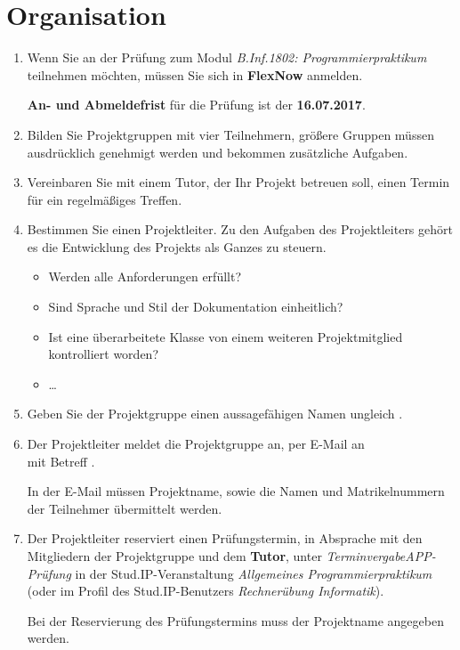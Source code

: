 \section*{Organisation}
\begin{enumerate}
\item Wenn Sie an der Prüfung zum Modul \emph{B.Inf.1802: Programmierpraktikum} teilnehmen möchten, müssen Sie sich in \textbf{FlexNow} anmelden.

\textbf{An- und Abmeldefrist} für die Prüfung ist der \textbf{16.07.2017}.
\item Bilden Sie Projektgruppen mit vier Teilnehmern, größere Gruppen müssen ausdrücklich genehmigt werden und bekommen zusätzliche Aufgaben.
\item Vereinbaren Sie mit einem Tutor, der Ihr Projekt betreuen soll, einen Termin für ein regelmäßiges Treffen.
\item Bestimmen Sie einen Projektleiter. Zu den Aufgaben des Projektleiters gehört es die Entwicklung des Projekts als Ganzes zu steuern.
\begin{itemize}
\item Werden alle Anforderungen erfüllt?
\item Sind Sprache und Stil der Dokumentation einheitlich?
\item Ist eine überarbeitete Klasse von einem weiteren Projektmitglied kontrolliert worden?
\item \dots
\end{itemize}
\item Geben Sie der Projektgruppe einen aussagefähigen Namen ungleich .
\item Der Projektleiter meldet die Projektgruppe an, per E-Mail an \\\href{mailto:brosenne@informatik.uni-goettingen.de}{} mit Betreff .

In der E-Mail müssen Projektname, sowie die Namen und Matrikelnummern der Teilnehmer übermittelt werden.
\item Der Projektleiter reserviert einen Prüfungstermin, in Absprache mit den Mitgliedern der Projektgruppe und dem \textbf{Tutor}, unter \textit{Terminvergabe\textrightarrow APP-Prüfung} in der Stud.IP-Veranstaltung \textit{Allgemeines Programmierpraktikum} (oder im Profil des Stud.IP-Benutzers \textit{Rechnerübung Informatik}).

Bei der Reservierung des Prüfungstermins muss der Projektname angegeben werden.
\end{enumerate}